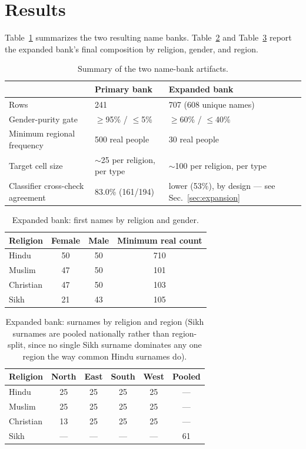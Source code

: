 \documentclass[11pt]{article}
\begin{document}
\section{Results}
\label{sec:results}

Table~\ref{tab:overview} summarizes the two resulting name banks. Table~\ref{tab:firstnames} and Table~\ref{tab:surnames} report the expanded bank's final composition by religion, gender, and region.

\begin{table}[h]
\centering
\caption{Summary of the two name-bank artifacts.}
\label{tab:overview}
\begin{tabular}{lll}
\toprule
& \textbf{Primary bank} & \textbf{Expanded bank} \\
\midrule
Rows & 241 & 707 (608 unique names) \\
Gender-purity gate & $\geq$95\% / $\leq$5\% & $\geq$60\% / $\leq$40\% \\
Minimum regional frequency & 500 real people & 30 real people \\
Target cell size & $\sim$25 per religion, per type & $\sim$100 per religion, per type \\
Classifier cross-check agreement & 83.0\% (161/194) & lower (53\%), by design --- see Sec.~\ref{sec:expansion} \\
\bottomrule
\end{tabular}
\end{table}

\begin{table}[h]
\centering
\caption{Expanded bank: first names by religion and gender.}
\label{tab:firstnames}
\begin{tabular}{lccc}
\toprule
\textbf{Religion} & \textbf{Female} & \textbf{Male} & \textbf{Minimum real count} \\
\midrule
Hindu     & 50 & 50 & 710 \\
Muslim    & 47 & 50 & 101 \\
Christian & 47 & 50 & 103 \\
Sikh      & 21 & 43 & 105 \\
\bottomrule
\end{tabular}
\end{table}

\begin{table}[h]
\centering
\caption{Expanded bank: surnames by religion and region (Sikh surnames are pooled nationally rather than region-split, since no single Sikh surname dominates any one region the way common Hindu surnames do).}
\label{tab:surnames}
\begin{tabular}{lccccc}
\toprule
\textbf{Religion} & \textbf{North} & \textbf{East} & \textbf{South} & \textbf{West} & \textbf{Pooled} \\
\midrule
Hindu     & 25 & 25 & 25 & 25 & --- \\
Muslim    & 25 & 25 & 25 & 25 & --- \\
Christian & 13 & 25 & 25 & 25 & --- \\
Sikh      & --- & --- & --- & --- & 61 \\
\bottomrule
\end{tabular}
\end{table}
\end{document}
